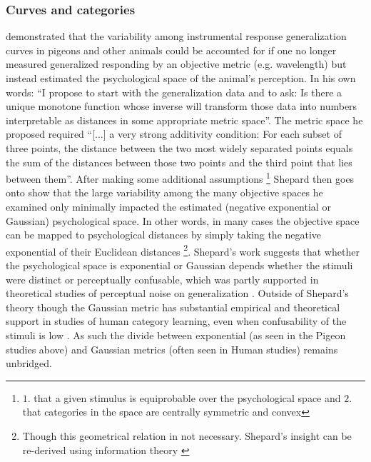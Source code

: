 \documentclass[doc,12pt]{apa}        %
\begin{document}
\subsubsection{Curves and categories}
\label{subsub:curves}
 demonstrated that the variability among instrumental response generalization curves in pigeons and other animals could be accounted for if one no longer measured generalized responding by an objective metric (e.g. wavelength) but instead estimated the psychological space of the animal's perception.  In his own words: ``I propose to start with the generalization data and to ask: Is there a unique monotone function whose inverse will transform those data into numbers interpretable as distances in some appropriate metric space''. The metric space he proposed required ``[...] a very strong additivity condition: For each subset of three points, the distance between the two most widely separated points equals the sum of the distances between those two points and the third point that lies between them''.  After making some additional assumptions
\footnote{
    $1.$ that a given stimulus is equiprobable over the psychological space and $2.$ that categories in the space are centrally symmetric and convex
} Shepard then goes onto show that the large variability among the many objective spaces he examined only minimally impacted the estimated (negative exponential or Gaussian) psychological space.  In other words, in many cases the objective space can be mapped to psychological distances by simply taking the negative exponential of their Euclidean distances
\footnote{
    Though this geometrical relation in not necessary.  Shepard's insight can be re-derived using information theory \cite{Chatera:2003p9103}}.  Shepard's work suggests that whether the psychological space is exponential or Gaussian depends whether the stimuli were distinct or perceptually confusable, which was partly supported in theoretical studies of perceptual noise on generalization \cite{Ennis:1988p9359}.  Outside of Shepard's theory though the Gaussian metric has substantial empirical and theoretical support in studies of human category learning, even when confusability of the stimuli is low \cite{Nosofsky:1985p9356,Medin:2012p9358}.  As such the divide between exponential (as seen in the Pigeon studies above) and Gaussian metrics (often seen in Human studies) remains unbridged.
\end{document}
